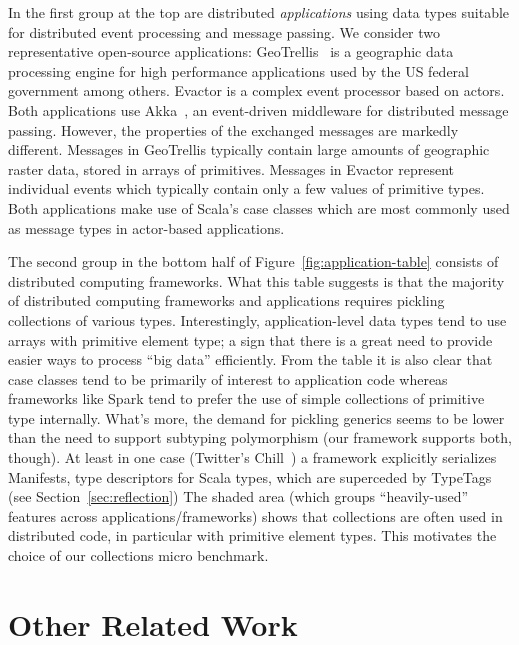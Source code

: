 \documentclass[preprint,10pt]{sigplanconf}
\theoremstyle{definition}
\theoremstyle{definition}
\begin{document}
In the first group at the top are distributed \emph{applications}
using data types suitable for distributed event processing and message
passing. We consider two representative open-source applications:
GeoTrellis~\cite{GeoTrellis} is a geographic data
processing engine for high performance applications used by the US
federal government among others.  Evactor is a complex event processor
based on actors. Both applications use Akka~\cite{Akka}, an
event-driven middleware for distributed message passing. However, the
properties of the exchanged messages are markedly different. Messages
in GeoTrellis typically contain large amounts of geographic raster
data, stored in arrays of primitives. Messages in Evactor represent
individual events which typically contain only a few values of
primitive types. Both applications make use of Scala's case classes
which are most commonly used as message types in actor-based
applications.

The second group in the bottom half of Figure~\ref{fig:application-table}
consists of distributed computing {frameworks}. What this table
suggests is that the majority of distributed computing frameworks and
applications requires pickling collections of various
types. Interestingly, application-level data types tend to use arrays
with primitive element type; a sign that there is a great need to
provide easier ways to process ``big data'' efficiently. From the
table it is also clear that case classes tend to be primarily of
interest to application code whereas frameworks like Spark tend to
prefer the use of simple collections of primitive type
internally. What's more, the demand for pickling generics seems to be
lower than the need to support subtyping polymorphism (our framework
supports both, though). At least in one case (Twitter's Chill~\cite{TwitterChill}) a
framework explicitly serializes Manifests, type descriptors for Scala
types, which are superceded by TypeTags (see
Section~\ref{sec:reflection})
The shaded area (which groups ``heavily-used'' features across
applications/frameworks) shows that collections are often used in distributed
code, in particular with primitive element types. This motivates the choice of
our collections micro benchmark.




\section{Other Related Work}
\label{sec:related-work}
\end{document}
